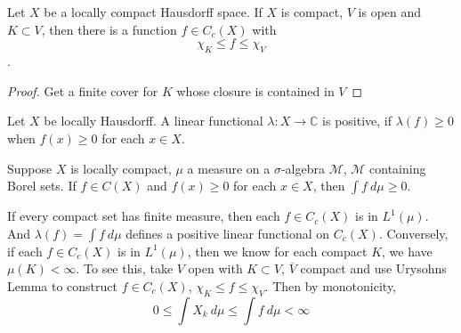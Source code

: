 
\chapter{}

\begin{theorem}
  Let $X$ be a locally compact Hausdorff space. If $X$ is compact, $V$ is open and $K \subset V$, then there is a function $f \in C_c(X)$ with $$\chi_K \le f \le \chi_V$$.
\end{theorem}
\begin{proof}
  Get a finite cover for $K$ whose closure is contained in $V$
\end{proof}

\begin{definition}
  Let $X$ be locally Hausdorff. A linear functional $\lambda: X \to \mathbb{C}$ is positive, if $\lambda(f) \ge 0$ when $f(x) \ge 0$ for each $x \in X$.
\end{definition}

\begin{remark}
  Suppose $X$ is locally compact, $\mu$ a measure on a $\sigma$-algebra $\mathcal{M}$, $\mathcal{M}$ containing Borel sets. If $f \in C(X)$ and $f(x) \ge 0$ for each $x \in X$, then $\int  f \ d \mu \ge 0$. 

  If every compact set has finite measure, then each $f \in C_c(X)$ is in $L^{1}(\mu)$. And $\lambda(f) = \int  f \ d \mu$ defines a positive linear functional on $C_c(X)$. Conversely, if each $f \in C_c(X)$ is in $L^1(\mu)$, then we know for each compact $K$, we have $\mu(K) < \infty$. To see this, take $V$ open with $K \subset V$, $\overline{V}$ compact and use Urysohns Lemma to construct $f \in C_c(X)$, $\chi_K \le f \le \chi_V$. Then by monotonicity, \[
      0 \le \int X_k \ d \mu \le \int  f \ d \mu < \infty
  \]
\end{remark}

